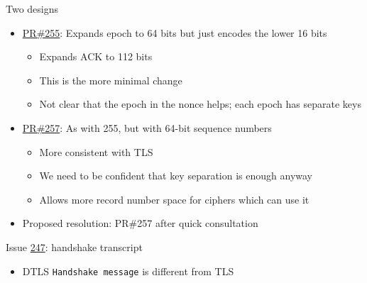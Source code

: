 \documentclass[helvetica]{beamer}
\begin{document}
\begin{frame}{Two designs}

  \begin{itemize}
  \item \href{https://github.com/tlswg/dtls13-spec/pull/255}{PR\#255}: 
    Expands epoch to 64 bits but just encodes the lower 16 bits
      \begin{itemize}
      \item Expands ACK to 112 bits        
      \item This is the more minimal change
      \item Not clear that the epoch in the nonce helps; each epoch has separate keys
      \end{itemize}

    \item \href{https://github.com/tlswg/dtls13-spec/pull/257}{PR\#257}:
        As with 255, but with 64-bit sequence numbers
        \begin{itemize}
        \item More consistent with TLS
        \item We need to be confident that key separation is enough anyway
        \item Allows more record number space for ciphers which can use it
        \end{itemize}
      \item Proposed resolution: PR\#257 after quick consultation
    \end{itemize}
\end{frame}                             


\begin{frame}{Issue \href{https://github.com/tlswg/dtls13-spec/issues/247}{247}: handshake transcript}
  
  \begin{itemize}
  \item DTLS \texttt{Handshake message} is different from TLS
  \end{itemize}


\end{frame}
\end{document}
